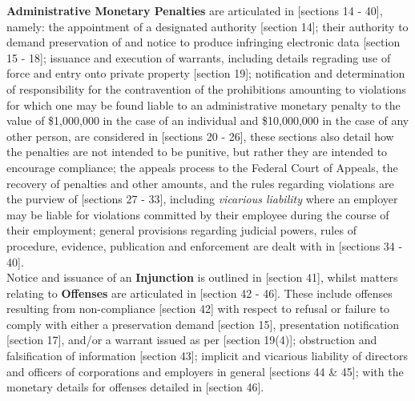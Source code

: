\documentclass[11pt]{article}
\begin{document}
\textbf{Administrative Monetary Penalties} are articulated in [sections
14 - 40]\cite{ca10_anti_spam_act}, namely: the appointment of a designated authority
[section 14]\cite{ca10_anti_spam_act}; their authority to demand preservation of
and notice to produce infringing electronic data [section
15 - 18]\cite{ca10_anti_spam_act}; issuance and execution of warrants, including
details regrading use of force and entry onto private property [section
19]\cite{ca10_anti_spam_act}; notification and determination of responsibility for
the contravention of the prohibitions amounting to violations for which one may
be found liable to an administrative monetary penalty to the value of \$1,000,000
in the case of an individual and \$10,000,000 in the case of any other person,
are considered in [sections 20 - 26]\cite{ca10_anti_spam_act}, these sections also
detail how the penalties are not intended to be punitive, but rather they are
intended to encourage compliance; the appeals process to the Federal Court of
Appeals, the recovery of penalties and other amounts, and the rules regarding
violations are the purview of [sections 27 - 33]\cite{ca10_anti_spam_act}, including
\emph{vicarious liability} where an employer may be liable for violations committed
by their employee during the course of their employment; general provisions
regarding judicial powers, rules of procedure, evidence, publication and
enforcement are dealt with in [sections 34 - 40]\cite{ca10_anti_spam_act}.\\

Notice and issuance of an \textbf{Injunction} is outlined in [section
41]\cite{ca10_anti_spam_act}, whilst matters relating to \textbf{Offenses} are
articulated in [section 42 - 46]\cite{ca10_anti_spam_act}. These include offenses
resulting from non-compliance [section 42]\cite{ca10_anti_spam_act} with respect
to refusal or failure to comply with either a preservation demand [section
15]\cite{ca10_anti_spam_act}, presentation notification [section
17]\cite{ca10_anti_spam_act}, and/or a warrant issued as per [section
19(4)]\cite{ca10_anti_spam_act}; obstruction and falsification of information
[section 43]; implicit and vicarious liability of directors and officers of
corporations and employers in general [sections 44 \& 45]\cite{ca10_anti_spam_act};
with the monetary details for offenses detailed in [section
46]\cite{ca10_anti_spam_act}.\\
\end{document}
